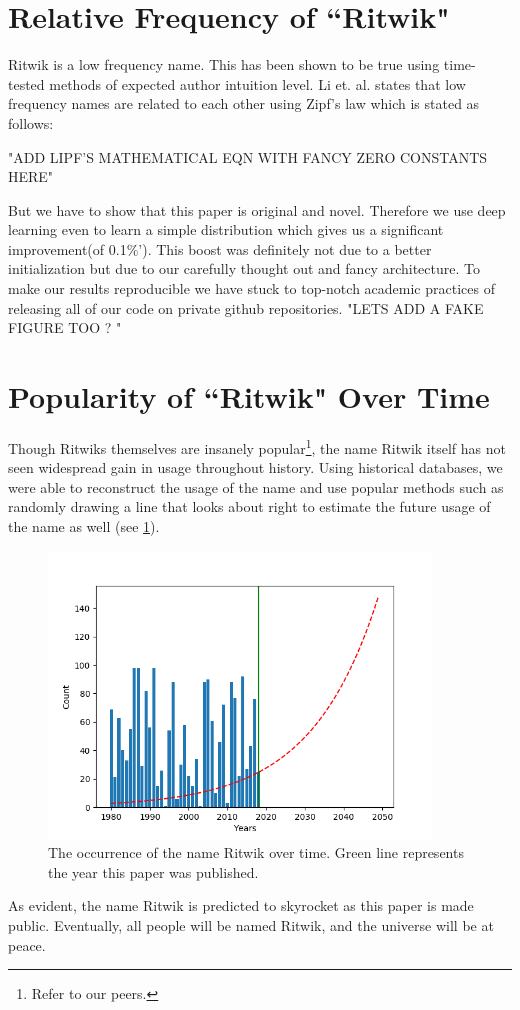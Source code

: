 \documentclass[]{article}
\begin{document}
\section{Relative Frequency of ``Ritwik"}
Ritwik is a low frequency name. This has been shown to be true using time-tested methods of expected author intuition level. Li et. al. \cite{Baby}states that low frequency names are related to each other using Zipf's law which is stated as follows:

"ADD LIPF'S MATHEMATICAL EQN WITH FANCY ZERO CONSTANTS HERE"

But we have to show that this paper is original and novel. Therefore we use deep learning even to learn a simple distribution which gives us a significant improvement(of 0.1$\%$'). This boost was definitely not due to a better initialization but due to our carefully thought out and fancy architecture. To make our results reproducible we have stuck to top-notch academic practices of releasing all of our code on private github repositories. 
"LETS ADD A FAKE FIGURE TOO ? " 


\section{Popularity of ``Ritwik" Over Time}
Though Ritwiks themselves are insanely popular\footnote{Refer to our peers.}, the name Ritwik itself has not seen widespread gain in usage throughout history. Using historical databases, we were able to reconstruct the usage of the name and use popular methods such as randomly drawing a line that looks about right to estimate the future usage of the name as well (see \ref{fig:usageofritwik}).
\begin{figure}[h]
	\centering
	\includegraphics[width=4in]{figures/UsageOfRitwik}
	\caption{The occurrence of the name Ritwik over time. Green line represents the year this paper was published.}
	\label{fig:usageofritwik}
\end{figure}
As evident, the name Ritwik is predicted to skyrocket as this paper is made public. Eventually, all people will be named Ritwik, and the universe will be at peace.
\end{document}

